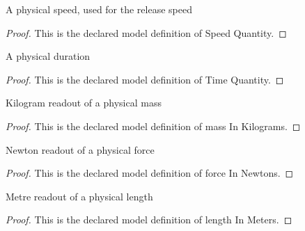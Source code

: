 \begin{definition}
  \label{def:physics:phyx-mini-0257:phyxminiproblems-problemphyxmini0257-speedquantity}
  A physical speed, used for the release speed
\end{definition}
\begin{proof}
  This is the declared model definition of Speed Quantity.
\end{proof}
\begin{definition}
  \label{def:physics:phyx-mini-0257:phyxminiproblems-problemphyxmini0257-timequantity}
  A physical duration
\end{definition}
\begin{proof}
  This is the declared model definition of Time Quantity.
\end{proof}
\begin{definition}
  \label{def:physics:phyx-mini-0257:phyxminiproblems-problemphyxmini0257-massinkilograms}
  Kilogram readout of a physical mass
\end{definition}
\begin{proof}
  This is the declared model definition of mass In Kilograms.
\end{proof}
\begin{definition}
  \label{def:physics:phyx-mini-0257:phyxminiproblems-problemphyxmini0257-forceinnewtons}
  Newton readout of a physical force
\end{definition}
\begin{proof}
  This is the declared model definition of force In Newtons.
\end{proof}
\begin{definition}
  \label{def:physics:phyx-mini-0257:phyxminiproblems-problemphyxmini0257-lengthinmeters}
  Metre readout of a physical length
\end{definition}
\begin{proof}
  This is the declared model definition of length In Meters.
\end{proof}

